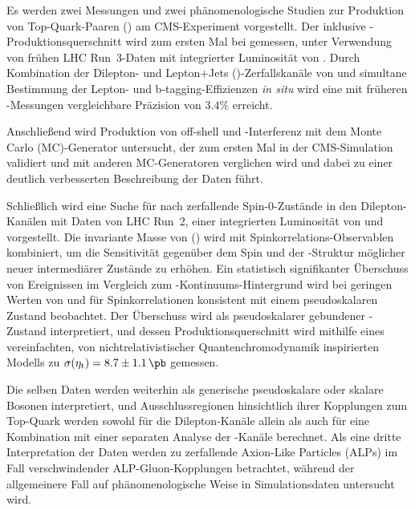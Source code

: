Es werden zwei Messungen und zwei ph{\"a}nomenologische Studien zur Produktion von Top-Quark-Paaren (\ttbar) am CMS-Experiment vorgestellt. Der inklusive \ttbar-Produktionsquerschnitt \sigmatt wird zum ersten Mal bei \sqrtsRIII gemessen, unter Verwendung von fr{\"u}hen LHC Run~3-Daten mit integrierter Luminosit{\"a}t von \lumiRIII. Durch Kombination der Dilepton- und Lepton+Jets (\ljets)-Zerfallskan{\"a}le von \ttbar und simultane Bestimmung der Lepton- und b-tagging-Effizienzen \textit{in situ} wird eine mit fr{\"u}heren \sigmatt-Messungen vergleichbare Pr{\"a}zision von $3.4\%$ erreicht.

Anschließend wird Produktion von off-shell \ttbar und \tttW-Interferenz mit dem Monte Carlo (MC)-Generator \bbfourl untersucht, der zum ersten Mal in der CMS-Simulation validiert und mit anderen MC-Generatoren verglichen wird und dabei zu einer deutlich verbesserten Beschreibung der Daten f{\"u}hrt.

Schlie{\ss}lich wird eine Suche f{\"u}r nach \ttbar zerfallende Spin-0-Zust{\"a}nde in den Dilepton-Kan{\"a}len mit Daten von LHC Run~2, einer integrierten Luminosit{\"a}t von \lumiRII und \sqrtsRII vorgestellt. Die invariante Masse von \ttbar (\mtt) wird mit Spinkorrelations-Observablen kombiniert, um die Sensitivit{\"a}t gegen{\"u}ber dem Spin und der \CP-Struktur m{\"o}glicher neuer intermedi{\"a}rer Zust{\"a}nde zu erh{\"o}hen. Ein statistisch signifikanter {\"U}berschuss von Ereignissen im Vergleich zum \ttbar-Kontinuums-Hintergrund wird bei geringen Werten von \mtt und f{\"u}r Spinkorrelationen konsistent mit einem pseudoskalaren Zustand beobachtet. Der {\"U}berschuss wird als pseudoskalarer gebundener \ttbar-Zustand \etat interpretiert, und dessen Produktionsquerschnitt wird mithilfe eines vereinfachten, von nichtrelativistischer Quantenchromodynamik inspirierten Modells zu $\sigetat =  8.7 \pm 1.1  \, \si{\pb}$ gemessen.

Die selben Daten werden weiterhin als generische pseudoskalare oder skalare Bosonen interpretiert, und Ausschlussregionen 
hinsichtlich ihrer Kopplungen zum Top-Quark werden sowohl f{\"u}r die Dilepton-Kan{\"a}le allein als auch f{\"u}r eine Kombination mit einer separaten Analyse der \ljets-Kan{\"a}le berechnet. Als eine dritte Interpretation der Daten werden zu \ttbar zerfallende Axion-Like Particles (ALPs) im Fall verschwindender ALP-Gluon-Kopplungen betrachtet, w{\"a}hrend der allgemeinere Fall auf ph{\"a}nomenologische Weise in Simulationsdaten untersucht wird.

